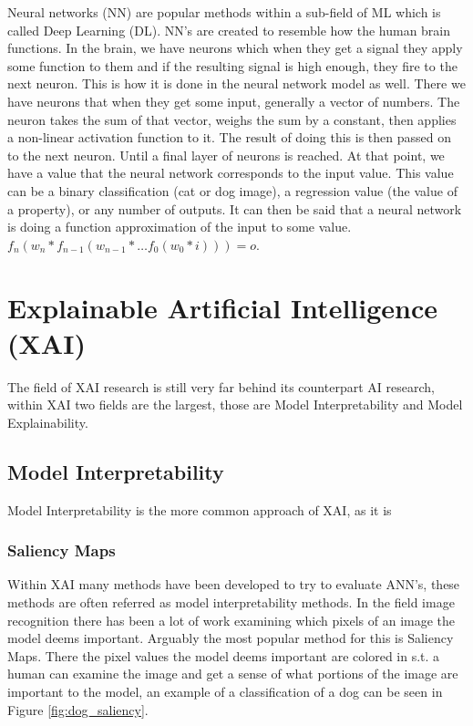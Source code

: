 Neural networks (NN) are popular methods within a sub-field of ML which is called Deep Learning (DL).
NN's are created to resemble how the human brain functions. In the brain, we have neurons which when they get a signal they apply some function to them and if the resulting signal is high enough, they fire to the next neuron. This is how it is done in the neural network model as well.
There we have neurons that when they get some input, generally a vector of numbers. The neuron takes the sum of that vector, weighs the sum by a constant, then applies a non-linear activation function to it. The result of doing this is then passed on to the next neuron. Until a final layer of neurons is reached. At that point, we have a value that the neural network corresponds to the input value. This value can be a binary classification (cat or dog image), a regression value (the value of a property), or any number of outputs. It can then be said that a neural network is doing a function approximation of the input to some value. $f_n ( w_n * f_{n-1} (w_{n-1} * \dots f_0(w_0*i))) = o$.

\section{Explainable Artificial Intelligence (XAI)}

The field of XAI research is still very far behind its counterpart AI research, within XAI two fields are the largest, those are Model Interpretability and Model Explainability.

\subsection{Model Interpretability}

Model Interpretability is the more common approach of XAI, as it is

\subsubsection{Saliency Maps}

Within XAI many methods have been developed to try to evaluate
ANN's, these methods are often referred as model interpretability methods.
In the field image recognition there has been a lot of work examining which
pixels of an image the model deems important. Arguably the most popular
method for this is Saliency Maps\cite{Koch:saliency}. There the pixel values the model
deems important are colored in s.t. a human can examine the image and get a
sense of what portions of the image are important to the model, an example of
a classification of a dog can be seen in Figure \ref{fig:dog_saliency}.


